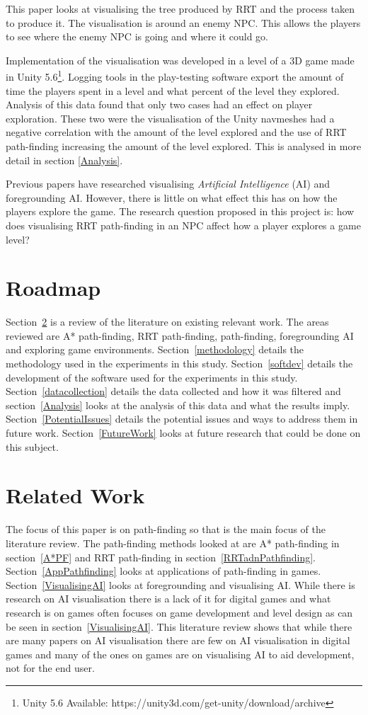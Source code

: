 \documentclass[journal]{IEEEtran}
\begin{document}
	This paper looks at visualising the tree produced by RRT and the process taken to produce it. The visualisation is around an enemy NPC. This allows the players to see where the enemy NPC is going and where it could go. 
	
	Implementation of the visualisation was developed in a level of a 3D game made in Unity 5.6\footnote[1]{Unity 5.6 Available: https://unity3d.com/get-unity/download/archive}. Logging tools in the play-testing software export the amount of time the players spent in a level and what percent of the level they explored. Analysis of this data found that only two cases had an effect on player exploration. These two were the visualisation of the Unity navmeshes had a negative correlation with the amount of the level explored and the use of RRT path-finding increasing the amount of the level explored. This is analysed in more detail in section \ref{Analysis}.
	
	Previous papers have researched visualising \textit{Artificial Intelligence} (AI) and foregrounding AI. However, there is little on what effect this has on how the players explore the game.
	The research question proposed in this project is: how does visualising RRT path-finding in an NPC affect how a player explores a game level?
	
	\section{Roadmap}
	Section~\ref{RelatedWork} is a review of the literature on existing relevant work. The areas reviewed are A* path-finding, RRT path-finding, path-finding, foregrounding AI and exploring game environments. 
	Section~\ref{methodology} details the methodology used in the experiments in this study. Section~\ref{softdev} details the development of the software used for the experiments in this study.
	Section~\ref{datacollection} details the data collected and how it was filtered and section~\ref{Analysis} looks at the analysis of this data and what the results imply. Section~\ref{PotentialIssues} details the potential issues and ways to address them in future work. Section~\ref{FutureWork} looks at future research that could be done on this subject. 
	
	\section{Related Work} \label{RelatedWork}
	The focus of this paper is on path-finding so that is the main focus of the literature review. The path-finding methods looked at are A* path-finding in section~\ref{A*PF} and RRT path-finding in section~\ref{RRTadnPathfinding}. Section~\ref{AppPathfinding} looks at applications of path-finding  in games. Section~\ref{VisualisingAI} looks at foregrounding and visualising AI. While there is research on AI visualisation there is a lack of it for digital games and what research is on games often focuses on game development and level design as can be seen in section~\ref{VisualisingAI}. 
	This literature review shows that while there are many papers on AI visualisation there are few on AI visualisation in digital games and many of the ones on games are on visualising AI to aid development, not for the end user.     
	
\end{document}
